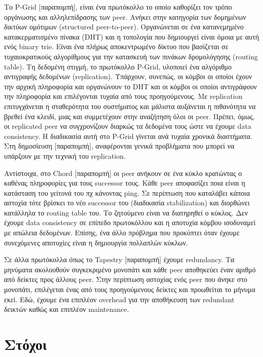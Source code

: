Το P-Grid $[$παραπομπή$]$, είναι ένα πρωτόκολλο το οποίο καθορίζει τον 
τρόπο οργάνωσης και αλληλεπίδρασης των peer. Ανήκει στην κατηγορία των 
δομημένων δικτύων ομότιμων (structured peer-to-peer). Οργανώνεται σε ένα 
κατανεμημένο κατακερματισμένο πίνακα (DHT) και η τοπολογία που 
δημιουργεί είναι όμοια με αυτή ενός binary trie. Είναι ένα πλήρως 
αποκεντρωμένο δίκτυο που βασίζεται σε τυχαιοκρατικούς αλγορίθμους για 
την κατασκευή των πινάκων δρομολόγησης (routing table). Τη δεδομένη 
στιγμή, το πρωτόκολλο P-Grid, υλοποιεί ένα αλγόριθμο αντιγραφής 
δεδομένων (replication). Υπάρχουν, συνεπώς, οι κόμβοι οι οποίοι έχουν 
την αρχική πληροφορία και οργανώνουν το DHT και οι κόμβοι οι οποίοι 
αντιγράφουν την πληροφορία και επιλέγονται τυχαία από τους 
προηγούμενους. Με replication επιτυγχάνεται η σταθερότητα του συστήματος 
και μάλιστα αυξάνεται η πιθανότητα να βρεθεί ένα κλειδί, μιας και 
συμμετέχουν στην αναζήτηση όλοι οι peer. Πρέπει, όμως, οι replicated 
peer να συγχρονίζουν διαρκώς τα δεδομένα τους ώστε να έχουμε data 
consistency. Η διαδικασία αυτή στο P-Grid γίνεται ανά τυχαία χρονικά 
διαστήματα. Στη δημοσίευση $[$παραπομπή$]$, αναφέρονται γενικά 
προβλήματα που μπορεί να υπάρξουν με την τεχνική του replication.

Αντίστοιχα, στο Chord $[$παραπομπή$]$ οι peer ανήκουν σε ένα κύκλο 
κρατώντας ο καθένας πληροφορίες για τους successor τους. Κάθε peer 
αποφασίζει ποια είναι η κατάσταση του γείτονά του πχ κάνοντας ping. Σε 
περίπτωση που καταλάβει κάποια αστοχία τότε βρίσκει το νέο successor του 
(διαδικασία stabilization) και διορθώνει κατάλληλα το routing table του. 
Το ζητούμενο είναι να διατηρηθεί ο κύκλος. Δεν έχουμε data consistency 
σε επίπεδο πρωτοκόλλου και η αποτυχία κόμβου ισοδυναμεί με απώλεια 
δεδομένων. Επίσης, ένα άλλο πρόβλημα που προκύπτει όταν έχουμε 
συνεχόμενες αποτυχίες είναι η δημιουργία πολλαπλών κύκλων.

 Σε άλλα πρωτόκολλα όπως το Tapestry $[$παραπομπή$]$ έχουμε redundancy. 
Τα μηνύματα ακολουθούν συγκεκριμένο μονοπάτι και κάθε peer αποθηκεύει 
έναν αριθμό από δείκτες προς άλλους peer. Στην περίπτωση αστοχίας ενός 
peer που άνηκε στο μονοπάτι, επιλέγεται ένας από τους προηγούμενους 
δείκτες και προωθείται το μήνυμα εκεί. Εδώ, έχουμε ένα επιπλέον overhead 
για την αποθήκευση των redundant δεικτών καθώς και επιπλέον maintenance.

\section{Στόχοι}

